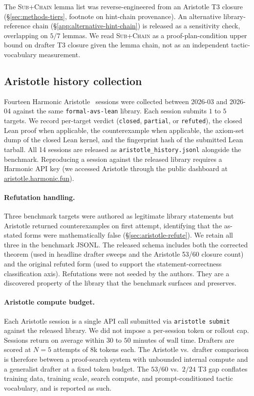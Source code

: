 The \textsc{Sub+Chain} lemma list was reverse-engineered from an
Aristotle T3 closure (\S\ref{sec:methods-tiers}, footnote on
hint-chain provenance). An alternative library-reference chain
(\S\ref{app:alternative-hint-chain}) is released as a sensitivity
check, overlapping on $5/7$ lemmas. We read \textsc{Sub+Chain} as a
proof-plan-condition upper bound on drafter T3 closure given the
lemma chain, not as an independent tactic-vocabulary measurement.

\subsection{Aristotle history collection}

Fourteen Harmonic Aristotle~\cite{aristotle2025} sessions were
collected between 2026-03 and 2026-04 against the same
\texttt{formal-avs-lean} library. Each session submits $1$ to
$5$ targets. We record per-target verdict (\texttt{closed},
\texttt{partial}, or \texttt{refuted}), the closed Lean proof
when applicable, the counterexample when applicable, the
axiom-set dump of the closed Lean kernel, and the fingerprint
hash of the submitted Lean tarball. All 14 sessions are
released as \texttt{aristotle\_history.jsonl} alongside the
benchmark. Reproducing a session against the released library
requires a Harmonic API key (we accessed Aristotle through the
public dashboard at \url{aristotle.harmonic.fun}).

\paragraph{Refutation handling.}
Three benchmark targets were authored as legitimate library
statements but Aristotle returned counterexamples on first
attempt, identifying that the as-stated forms were
mathematically false (\S\ref{sec:aristotle-refute}). We retain
all three in the benchmark JSONL. The released schema includes
both the corrected theorem (used in headline drafter sweeps and
the Aristotle 53/60 closure count) and the original refuted
form (used to support the statement-correctness classification
axis). Refutations were not seeded by the authors. They are a
discovered property of the library that the benchmark surfaces
and preserves.

\paragraph{Aristotle compute budget.}
Each Aristotle session is a single API call submitted via
\texttt{aristotle submit} against the released library. We did
not impose a per-session token or rollout cap. Sessions return
on average within $30$ to $50$ minutes of wall time.
Drafters are scored at $N=5$ attempts of $8$k tokens each.
The Aristotle vs.\ drafter comparison is therefore between a
proof-search system with unbounded internal compute and a
generalist drafter at a fixed token budget. The $53/60$
vs.\ $2/24$ T3 gap conflates training data, training scale,
search compute, and prompt-conditioned tactic vocabulary, and
is reported as such.

